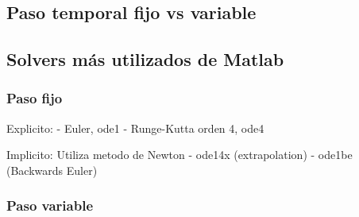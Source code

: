 





\subsection{Paso temporal fijo vs variable}

\subsection{Solvers más utilizados de Matlab}

\subsubsection{Paso fijo}

Explicito:
- Euler, ode1
- Runge-Kutta orden 4, ode4

Implicito: Utiliza metodo de Newton
- ode14x (extrapolation)
- ode1be (Backwards Euler)

\subsubsection{Paso variable}

